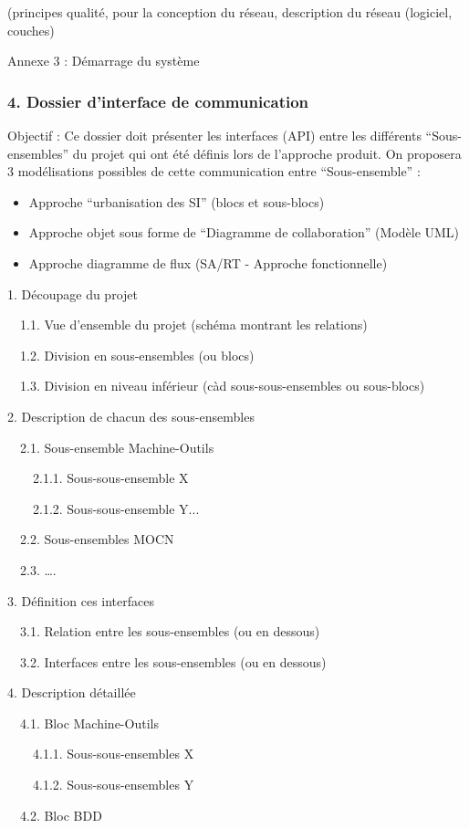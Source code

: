\documentclass{article}
\begin{document}
(principes qualité, pour la conception du réseau, description du réseau
(logiciel, couches)

Annexe 3 : Démarrage du système

\subsubsection[4. Dossier d’interface de communication]{4. Dossier
d’interface de communication}
Objectif : Ce dossier doit présenter les interfaces (API) entre les
différents “Sous-ensembles” du projet qui ont été définis lors de
l’approche produit. On proposera 3 modélisations possibles de cette
communication entre “Sous-ensemble” :

\begin{itemize}
\item Approche “urbanisation des SI” (blocs et sous-blocs)
\item Approche objet sous forme de “Diagramme de collaboration” (Modèle
UML)
\item Approche diagramme de flux (SA/RT - Approche fonctionnelle)
\end{itemize}
1. Découpage du projet

\ \ 1.1. Vue d’ensemble du projet (schéma montrant les relations)

\ \ 1.2. Division en sous-ensembles (ou blocs)

\ \ 1.3. Division en niveau inférieur (càd sous-sous-ensembles ou
sous-blocs)

2. Description de chacun des sous-ensembles

\ \ 2.1. Sous-ensemble Machine-Outils

\ \ \ \ 2.1.1. Sous-sous-ensemble X

\ \ \ \ 2.1.2. Sous-sous-ensemble Y...

\ \ 2.2. Sous-ensembles MOCN

\ \ 2.3. ….

3. Définition ces interfaces

\ \ 3.1. Relation entre les sous-ensembles (ou en dessous)

\ \ 3.2. Interfaces entre les sous-ensembles (ou en dessous)

4. Description détaillée

\ \ 4.1. Bloc Machine-Outils

\ \ \ \ 4.1.1. Sous-sous-ensembles X

\ \ \ \ 4.1.2. Sous-sous-ensembles Y

\ \ 4.2. Bloc BDD
\end{document}
